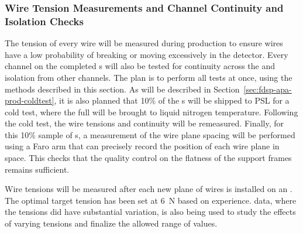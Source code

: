 \subsubsection{Wire Tension Measurements and Channel Continuity and Isolation Checks}
\label{sec:fdsp-apa-prod-qa-tension}

The tension of every wire will be measured during production to ensure wires have a low probability of breaking or moving excessively in the detector.  Every channel on the completed s will also be tested for continuity across the  and isolation from other channels.  The plan is to perform all tests at once, using the methods described in this section.  As will be described in Section~\ref{sec:fdsp-apa-prod-coldtest}, it is also planned that 10$\%$ of the s will be shipped to PSL for a cold test, where the full  will be brought to liquid nitrogen temperature. Following the cold test, the wire tensions and continuity will be remeasured.  Finally, for this 10$\%$ sample of s, a measurement of the wire plane spacing will be performed using a Faro arm that can precisely record the position of each wire plane in space. This checks that the quality control on the flatness of the support frames remains sufficient.  

Wire tensions will be measured after each new plane of wires is installed on an . The optimal target tension has been set at \SI{6}{N} based on  experience.   data, where the tensions did have substantial variation, is also being used to study the effects of varying tensions and finalize the allowed range of values.  

